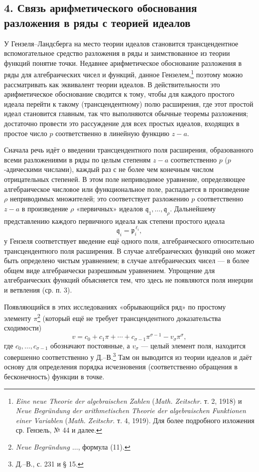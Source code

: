 \documentclass[11pt]{article}
\providecommand{\frp}{\mathfrak p}
\begin{document}
\subsection*{4. Связь арифметического обоснования разложения в ряды с теорией идеалов}
У Гензеля--Ландсберга на место теории идеалов становится трансцендентное вспомогательное средство разложения в ряды и заимствованное из теории функций понятие точки. Недавнее арифметическое обоснование разложения в ряды для алгебраических чисел и функций, данное Гензелем,\footnote{\emph{Eine neue Theorie der algebraischen Zahlen} (\emph{Math. Zeitschr.} т. 2, 1918) и \emph{Neue Begründung der arithmetischen Theorie der algebraischen Funktionen einer Variablen} (\emph{Math. Zeitschr.} т. 4, 1919). Для более подробного изложения ср. Гензель, № 44 и далее.} поэтому можно рассматривать как эквивалент теории идеалов. В действительности это арифметическое обоснование сводится к тому, чтобы для каждого простого идеала перейти к такому (трансцендентному) полю расширения, где этот простой идеал становится главным, так что выполняются обычные теоремы разложения; достаточно провести это рассуждение для всех простых идеалов, входящих в простое число \(p\) соответственно в линейную функцию \(z-a\).

Сначала речь идёт о введении трансцендентного поля расширения, образованного всеми разложениями в ряды по целым степеням \(z-a\) соответственно \(p\) (\(p\)-адическими числами), каждый раз с не более чем конечным числом отрицательных степеней. В этом поле неприводимое уравнение, определяющее алгебраическое числовое или функциональное поле, распадается в произведение \(\rho\) неприводимых множителей; это соответствует разложению \(p\) соответственно \(z-a\) в произведение \(\rho\) «первичных» идеалов \(\mathfrak q_1,\ldots,\mathfrak q_\rho\). Дальнейшему представлению каждого первичного идеала как степени простого идеала
\[
\mathfrak q_i=\frp_i^{\,\ell_i},
\]
у Гензеля соответствует введение ещё одного поля, алгебраического относительно трансцендентного поля расширения. В случае алгебраических функций оно может быть определено чистым уравнением; в случае алгебраических чисел --- в более общем виде алгебраически разрешимым уравнением. Упрощение для алгебраических функций объясняется тем, что здесь не появляются поля инерции и ветвления (ср. п. 3).

Появляющийся в этих исследованиях «обрывающийся ряд» по простому элементу \(\pi\)\footnote{\emph{Neue Begründung \(\ldots\)}, формула (11).} (который ещё не требует трансцендентного доказательства сходимости)
\[
v=c_0+c_1\pi+\cdots+c_{\sigma-1}\pi^{\sigma-1}-v_\sigma\pi^\sigma,
\]
где \(c_0,\ldots,c_{\sigma-1}\) обозначают постоянные, а \(v_\sigma\) --- целый элемент поля, находится совершенно соответственно у Д.--В.\footnote{Д.--В., с. 231 и § 15.} Там он выводится из теории идеалов и даёт основу для определения порядка исчезновения (соответственно обращения в бесконечность) функции в точке.
\end{document}
